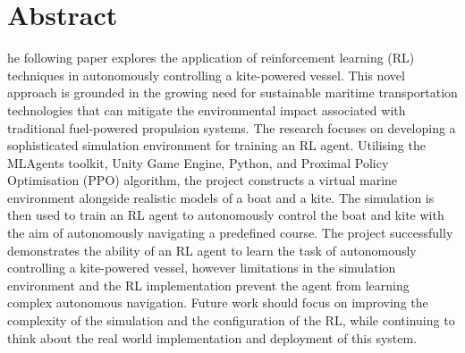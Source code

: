 
\chapter*{Abstract}
\begin{SingleSpace}
he following paper explores the application of reinforcement learning (RL) techniques in autonomously controlling a kite-powered vessel. This novel approach is grounded in the growing need for sustainable maritime transportation technologies that can mitigate the environmental impact associated with traditional fuel-powered propulsion systems. The research focuses on developing a sophisticated simulation environment for training an RL agent. Utilising the MLAgents toolkit, Unity Game Engine, Python, and Proximal Policy Optimisation (PPO) algorithm, the project constructs a virtual marine environment alongside realistic models of a boat and a kite. The simulation is then used to train an RL agent to autonomously control the boat and kite with the aim of autonomously navigating a predefined course. The project successfully demonstrates the ability of an RL agent to learn the task of autonomously controlling a kite-powered vessel, however limitations in the simulation environment and the RL implementation prevent the agent from learning complex autonomous navigation. Future work should focus on improving the complexity of the simulation and the configuration of the RL, while continuing to think about the real world implementation and deployment of this system.
\end{SingleSpace}
\clearpage

